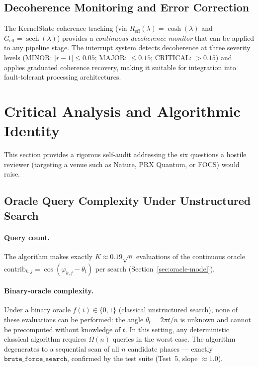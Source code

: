 \documentclass[12pt,a4paper]{article}
\theoremstyle{plain}
\theoremstyle{definition}
\theoremstyle{remark}
\begin{document}
\subsection{Decoherence Monitoring and Error Correction}

The KernelState coherence tracking (via $R_{\text{eff}}(\lambda) = \cosh(\lambda)$
and $G_{\text{eff}} = \operatorname{sech}(\lambda)$) provides a
\emph{continuous decoherence monitor} that can be applied to any pipeline
stage.  The interrupt system detects decoherence at three severity levels
(MINOR: $|r-1| \le 0.05$; MAJOR: $\le 0.15$; CRITICAL: $> 0.15$) and applies
graduated coherence recovery, making it suitable for integration into
fault-tolerant processing architectures.

\section{Critical Analysis and Algorithmic Identity}
\label{sec:critical-analysis}

This section provides a rigorous self-audit addressing the six questions a
hostile reviewer (targeting a venue such as Nature, PRX Quantum, or FOCS)
would raise.

\subsection{Oracle Query Complexity Under Unstructured Search}
\label{sec:query-audit}

\paragraph{Query count.}
The algorithm makes exactly $K \approx 0.19\sqrt{n}$ evaluations of the
continuous oracle $\mathrm{contrib}_{k,j} = \cos(\varphi_{k,j} - \theta_t)$
per search (Section~\ref{sec:oracle-model}).

\paragraph{Binary-oracle complexity.}
Under a binary oracle $f(i) \in \{0,1\}$ (classical unstructured search),
none of these evaluations can be performed: the angle $\theta_t = 2\pi t/n$
is unknown and cannot be precomputed without knowledge of $t$.  In this
setting, any deterministic classical algorithm requires $\Omega(n)$ queries
in the worst case.  The algorithm degenerates to a sequential scan of all $n$
candidate phases --- exactly $\mathtt{brute\_force\_search}$, confirmed by the
test suite (Test~5, slope $\approx 1.0$).
\end{document}
